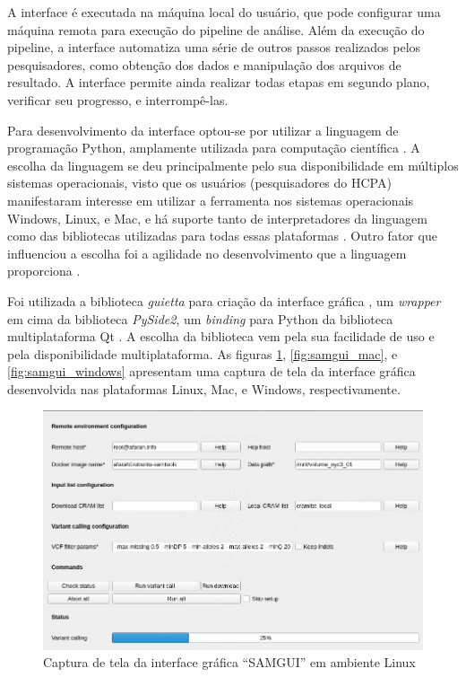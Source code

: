 \documentclass[cic,tc]{iiufrgs}
\begin{document}
{A interface é executada na máquina local do usuário, que pode configurar uma
máquina remota para execução do pipeline de análise. Além da execução do
pipeline, a interface automatiza uma série de outros passos realizados pelos
pesquisadores, como obtenção dos dados e manipulação dos arquivos de resultado.
A interface permite ainda realizar todas etapas em segundo plano, verificar seu
progresso, e interrompê-las.

Para desenvolvimento da interface optou-se por utilizar a linguagem de
programação Python, amplamente utilizada para computação
científica \cite{oliphant2007python}. A escolha da linguagem se deu
principalmente pelo sua disponibilidade em múltiplos sistemas operacionais,
visto que os usuários (pesquisadores do HCPA) manifestaram interesse em
utilizar a ferramenta nos sistemas operacionais Windows, Linux, e Mac, e há
suporte tanto de interpretadores da linguagem como das bibliotecas utilizadas
para todas essas plataformas \cite{oliphant2007python}. Outro fator que
influenciou a escolha foi a agilidade no desenvolvimento que a linguagem
proporciona \cite{oliphant2007python}.

Foi utilizada a biblioteca \textit{guietta} para criação da interface
gráfica \cite{guietta}, um \textit{wrapper} em cima da biblioteca
\textit{PySide2}, um \textit{binding} para Python da biblioteca multiplataforma
Qt \cite{loganathan2013pyside}. A escolha da biblioteca vem pela sua facilidade
de uso e pela disponibilidade multiplataforma. As figuras
\ref{fig:samgui_linux}, \ref{fig:samgui_mac}, e \ref{fig:samgui_windows}
apresentam uma captura de tela da interface gráfica desenvolvida nas
plataformas Linux, Mac, e Windows, respectivamente.

\begin{figure}
  \caption{Captura de tela da interface gráfica ``SAMGUI'' em ambiente Linux}
    \begin{center}
      \includegraphics[width=0.85\linewidth]{img/samgui_linux.png}
    \end{center}
    \label{fig:samgui_linux}
\end{figure}

}
\end{document}
